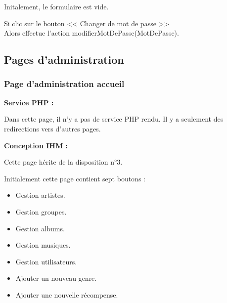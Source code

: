 			\begin{paragraphe}
				Initalement, le formulaire est vide.
			\end{paragraphe}


			\begin{paragraphe}
				Si clic sur le bouton << Changer de mot de passe >> \\
				Alors effectue l'action modifierMotDePasse(MotDePasse).
			\end{paragraphe}

	\clearpage

	\subsection{Pages d'administration}
		\subsubsection{Page d'administration accueil}

			\begin{paragraphe}
				\textbf{Service PHP :}
			\end{paragraphe}

			\begin{paragraphe}
				Dans cette page, il n'y a pas de service PHP rendu. Il y a seulement des redirections vers d'autres pages.
			\end{paragraphe}

			\begin{paragraphe}
				\textbf{Conception IHM :}
			\end{paragraphe}

			\begin{paragraphe}
				Cette page hérite de la disposition n°3. \par
				Initialement cette page contient sept boutons :
				\begin{itemize}
					\item Gestion artistes.
					\item Gestion groupes.
					\item Gestion albums.
					\item Gestion musiques.
					\item Gestion utilisateurs.
					\item Ajouter un nouveau genre.
					\item Ajouter une nouvelle récompense.
				\end{itemize}
			\end{paragraphe}

